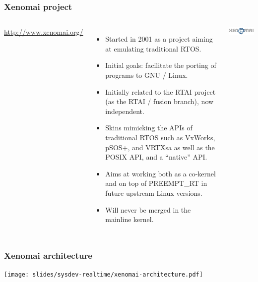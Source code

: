 \begin{frame}
  \frametitle{Xenomai project}
  \begin{columns}[T]
    \url{http://www.xenomai.org/}
    \begin{itemize}
    \item Started in 2001 as a project aiming at emulating traditional
      RTOS.
    \item Initial goals: facilitate the porting of programs to GNU /
      Linux.
    \item Initially related to the RTAI project (as the RTAI / fusion
      branch), now independent.
    \item Skins mimicking the APIs of traditional RTOS such as
      VxWorks, pSOS+, and VRTXsa as well as the POSIX API, and a
      “native” API.
    \item Aims at working both as a co-kernel and on top of
      PREEMPT\_RT in future upstream Linux versions.
    \item Will never be merged in the mainline kernel.
    \end{itemize}
    \includegraphics[width=\textwidth]{slides/sysdev-realtime/xenomai.png}
  \end{columns}
\end{frame}

\begin{frame}
  \frametitle{Xenomai architecture}
  \begin{center}
    \texttt{[image: slides/sysdev-realtime/xenomai-architecture.pdf]}
  \end{center}
\end{frame}

